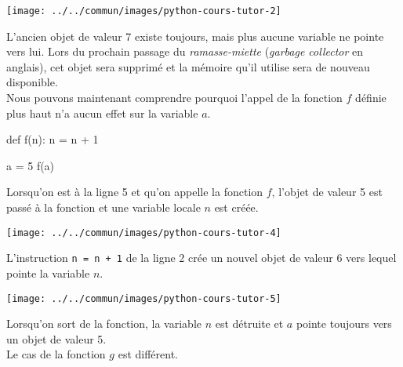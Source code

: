 \documentclass{magnolia}
\begin{document}
\begin{center}
\texttt{[image: ../../commun/images/python-cours-tutor-2]}
\end{center}
\noindent
L'ancien objet de valeur 7 existe toujours, mais plus aucune variable ne pointe vers lui. Lors du prochain passage
du \emph{ramasse-miette} (\emph{garbage collector} en anglais), cet objet sera supprimé et la mémoire qu'il utilise
sera de nouveau disponible.\\

Nous pouvons maintenant comprendre pourquoi l'appel de la fonction $f$ définie plus haut n'a aucun effet sur
la variable $a$.

\begin{pythoncodeline}
def f(n):
    n = n + 1

a = 5
f(a)
\end{pythoncodeline}
Lorsqu'on est à la ligne 5 et qu'on appelle la fonction $f$, l'objet de valeur 5 est passé à la fonction
et une variable locale $n$ est créée.

\begin{center}
\texttt{[image: ../../commun/images/python-cours-tutor-4]}
\end{center}
\noindent
L'instruction \verb!n = n + 1! de la ligne 2 crée un nouvel objet de valeur 6 vers lequel pointe la
variable $n$.
\begin{center}
\texttt{[image: ../../commun/images/python-cours-tutor-5]}
\end{center}
\noindent
Lorsqu'on sort de la fonction, la variable $n$ est détruite et $a$ pointe toujours vers un objet
de valeur 5.\\

Le cas de la fonction $g$ est différent. 
\end{document}
